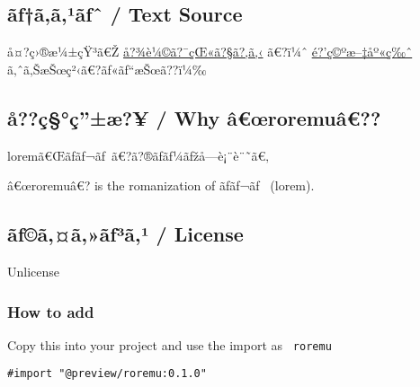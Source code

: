 \begin{Shaded}
\begin{Highlighting}[]



\end{Highlighting}
\end{Shaded}

\subsection{ãƒ†ã‚­ã‚¹ãƒˆ / Text
Source}\label{uxe3ux192uxe3uxe3uxb9uxe3ux192ux2c6-text-source}

å¤?ç›®æ¼±çŸ³ã€Ž
\href{https://ja.wikipedia.org/wiki/\%E5\%90\%BE\%E8\%BC\%A9\%E3\%81\%AF\%E7\%8C\%AB\%E3\%81\%A7\%E3\%81\%82\%E3\%82\%8B}{å?¾è¼©ã?¯çŒ«ã?§ã?‚ã‚‹}
ã€?ï¼ˆ
\href{https://www.aozora.gr.jp/cards/000148/card789.html}{é?'ç©ºæ--‡åº«ç‰ˆ}
ã‚ˆã‚ŠæŠœç²‹ã€?ãƒ«ãƒ``æŠœã??ï¼‰

\subsection{å??ç§°ç''±æ?¥ / Why
â€œroremuâ€??}\label{uxe5uxe7uxe7uxe6-why-uxe2ux153roremuuxe2}

loremã€Œãƒ­ãƒ¬ãƒ~ã€?ã?®ãƒ­ãƒ¼ãƒžå­---è¡¨è¨˜ã€‚

â€œroremuâ€? is the romanization of ãƒ­ãƒ¬ãƒ~ (lorem).

\subsection{ãƒ©ã‚¤ã‚»ãƒ³ã‚¹ /
License}\label{uxe3ux192uxe3uxe3uxe3ux192uxb3uxe3uxb9-license}

Unlicense

\subsubsection{How to add}\label{how-to-add}

Copy this into your project and use the import as \texttt{\ roremu\ }

\begin{verbatim}
#import "@preview/roremu:0.1.0"
\end{verbatim}

